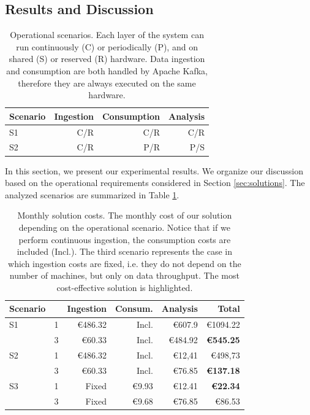 {\subsection{Results and Discussion} \label{sec:results}

\begin{table}[ht]
\centering
\caption{Operational scenarios. Each layer of the system can run continuously (C) or periodically (P), and on shared (S) or reserved (R) hardware. Data ingestion and consumption are both handled by Apache Kafka, therefore they are always executed on the same hardware.}
\begin{tabular}{@{}lrrr@{}} \toprule
Scenario & Ingestion & Consumption & Analysis \\
\midrule
S1 & C/R & C/R & C/R \\
S2 & C/R & P/R & P/S \\
\bottomrule
\end{tabular}
\label{tab:scenarios}
\end{table}

In this section, we present our experimental results. We organize our discussion based on the operational requirements considered in Section \ref{sec:solutions}. The analyzed scenarios are summarized in Table \ref{tab:scenarios}. 

\begin{table}[ht]
\centering
\caption{Monthly solution costs. The monthly cost of our solution depending on the operational scenario. Notice that if we perform continuous ingestion, the consumption costs are included (Incl.). The third scenario represents the case in which ingestion costs are fixed, i.e. they do not depend on the number of machines, but only on data throughput. The most cost-effective solution is highlighted.}
\begin{tabular}{@{}llrrrr@{}} \toprule
Scenario & & Ingestion & Consum. & Analysis & Total\\
\midrule
S1 & \sparkdi{}1 & \euro486.32 & Incl. & \euro607.9 & \euro1094.22 \\
   & \sti{}3 & \euro60.33 & Incl. & \euro484.92 & \textbf{\euro545.25}\\
\midrule
S2 & \sparkdi{}1 & \euro486.32 & Incl. & \euro12,41 & \euro498,73\\
   & \sti{}3 & \euro60.33 & Incl. & \euro76.85 & \textbf{\euro137.18}\\
\midrule
S3 & \sparkdi{}1 & Fixed & \euro9.93 & \euro12.41 & \textbf{\euro22.34}\\
   & \sti{}3 & Fixed & \euro9.68 & \euro76.85 & \euro86.53\\
\bottomrule
\end{tabular}
\label{tab:monthly}
\end{table}

}
